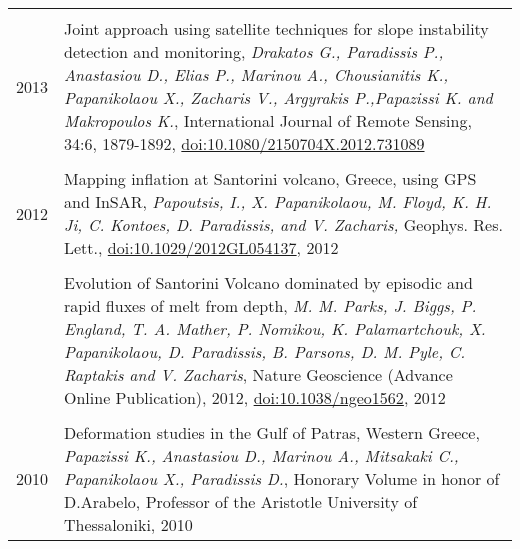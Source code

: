 \documentclass[a4paper,10pt]{article} %
\begin{document}
\begin{longtable}{r|p{14cm}}
\multicolumn{2}{c}{} \\
  \textsc{2013}


  & Joint approach using satellite techniques for slope instability detection and monitoring,
  \emph{Drakatos G., Paradissis P., Anastasiou D., Elias P., Marinou A., Chousianitis K., Papanikolaou X., Zacharis V., Argyrakis P.,Papazissi K. and Makropoulos K.},
  International Journal of Remote Sensing, 34:6, 1879-1892, \href{http://www.tandfonline.com/doi/abs/10.1080/2150704X.2012.731089#.Uxni9meIaig}{doi:10.1080/2150704X.2012.731089}\\

\multicolumn{2}{c}{} \\ 
  \textsc{2012}
  & Mapping inflation at Santorini volcano, Greece, using GPS and InSAR,
  \emph{Papoutsis, I., X. Papanikolaou, M. Floyd, K. H. Ji, C. Kontoes, D. Paradissis, and V. Zacharis,}
  Geophys. Res. Lett., \href{http://www.agu.org/pubs/crossref/pip/2012GL054137.shtml}{doi:10.1029/2012GL054137}, 2012\\

  &\\

  & Evolution of Santorini Volcano dominated by episodic and rapid fluxes of melt from depth,
  \emph{M. M. Parks, J. Biggs, P. England, T. A. Mather, P. Nomikou, K. Palamartchouk, X. Papanikolaou, D. Paradissis, B. Parsons, D. M. Pyle, C. Raptakis and V. Zacharis},
  Nature Geoscience (Advance Online Publication), 2012, \href{http://www.nature.com/ngeo/journal/v5/n10/full/ngeo1562.html}{doi:10.1038/ngeo1562}, 2012\\

\multicolumn{2}{c}{} \\ 
  \textsc{2010}
  & Deformation studies in the Gulf of Patras, Western Greece,
  \emph{Papazissi K., Anastasiou D., Marinou A., Mitsakaki C., Papanikolaou X., Paradissis D.}, 
  Honorary Volume in honor of D.Arabelo, Professor of the Aristotle University of Thessaloniki, 2010\\
\end{longtable}
\end{document}
